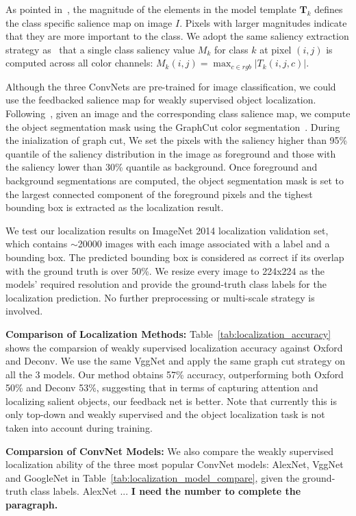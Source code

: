 As pointed in~\cite{simonyan2013deep}, the magnitude of the elements in the model template $\mathbf{T}_k$ defines the class specific salience map on image $I$. Pixels with larger magnitudes indicate that they are more important to the class. We adopt the same saliency extraction strategy as~\cite{simonyan2013deep} that a single class saliency value $M_k$ for class $k$ at pixel $(i,j)$ is computed across all color channels: $M_k(i,j) = \max_{c \in rgb} | T_k(i,j,c) |$.

Although the three ConvNets are pre-trained for image classification, we could use the feedbacked salience map for weakly supervised object localization. Following~\cite{simonyan2013deep}, given an image and the corresponding class salience map, we compute the object segmentation mask using the GraphCut color segmentation~\cite{yuri2001interactive}. During the inialization of graph cut, We set the pixels with the saliency higher than 95\% quantile of the saliency distribution in the image as foreground and those with the saliency lower than 30\% quantile as background. Once foreground and background segmentations are computed, the object segmentation mask is set to the largest connected component of the foreground pixels and the tighest bounding box is extracted as the localization result.

We test our localization results on ImageNet 2014 localization validation set, which contains $\sim$20000 images with each image associated with a label and a bounding box. The predicted bounding box is considered as correct if its overlap with the ground truth is over 50\%. We resize every image to 224x224 as the models' required resolution and provide the ground-truth class labels for the localization prediction. No further preprocessing or multi-scale strategy is involved. 

\textbf{Comparison of Localization Methods:} Table~\ref{tab:localization_accuracy} shows the comparsion of weakly supervised localization accuracy against Oxford and Deconv. We use the same VggNet and apply the same graph cut strategy on all the 3 models. Our method obtains 57\% accuracy, outperforming both Oxford 50\% and Deconv 53\%, suggesting that in terms of capturing attention and localizing salient objects, our feedback net is better. Note that currently this is only top-down and weakly supervised and the object localization task is not taken into account during training.

\textbf{Comparsion of ConvNet Models:} We also compare the weakly supervised localization ability of the three most popular ConvNet models: AlexNet, VggNet and GoogleNet in Table~\ref{tab:localization_model_compare}, given the ground-truth class labels. AlexNet ... \textbf{\color{red} I need the number to complete the paragraph. } 

